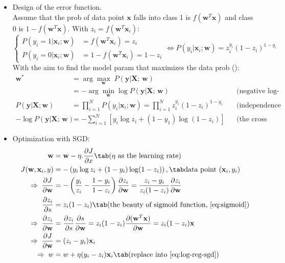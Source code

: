 \begin{itemize}
	\item Design of the error function.\\
	Assume that the \ac{prob} of data point $\textbf{x}$ falls into class 1 is $f(\textbf{w}^T\textbf{x})$ and class 0 is $1-f(\textbf{w}^T\textbf{x})$. With $z_i = f(\textbf{w}^T\textbf{x}_i)$:
	\begin{equation}
		\begin{cases}
			P(y_i=1|\textbf{x}_i; \textbf{w}) &= f(\textbf{w}^T\textbf{x}_i) = z_i \\
			P(y_i=0|\textbf{x}_i; \textbf{w}) &= 1 - f(\textbf{w}^T\textbf{x}_i) =1 - z_i
		\end{cases} \Leftrightarrow P(y_i | \textbf{x}_i; \textbf{w}) = z_i^{y_i}(1-z_i)^{1-y_i}
	\end{equation}
	With the aim to find the model \ac{param} that maximizes the data \ac{prob} ():
	\begin{align*}
		\textbf{w}^* &= \arg \underset{\textbf{w}}{\max}\;P(\textbf{y}|\textbf{X; w}) && \\
		&= - \arg \underset{\textbf{w}}{\min} \log P(\textbf{y}|\textbf{X; w}) && \text{(negative log-likelihood)} \\
		P(\mathbf{y}|\mathbf{X}; \mathbf{w}) &= \prod_{i=1}^N P(y_i| \mathbf{x}_i; \mathbf{w}) = \prod_{i=1}^N z_i^{y_i}(1 - z_i)^{1- y_i} && \text{(independence assumption)} \\
		- \log P(\textbf{y}|\textbf{X; w}) &= - \sum_{i=1}^{N} [ y_i\log z_i + (1-y_1)\log (1-z_i) ] && \text{(the cross entropy error)}
	\end{align*}
	
	\item Optimization with \ac{SGD}:
	\begin{align}
			\textbf{w} &= \textbf{w} - \eta.\frac{\partial J}{\partial x} \tab \text{($\eta$ as the learning rate)}
			\label{eq:log-reg-sgd}\\			
			J(\textbf{w}, \textbf{x}_i, y) &= -\left( y_i\log z_i + (1-y_i)\log(1-z_i) \right), \tab \text{data point $(\textbf{x}_i, y_i)$} \\
			\Rightarrow \; \frac{\partial J}{\partial \textbf{w}} &= - \left( \frac{y_i}{z_i} - \frac{1-y_i}{1-z_i} \right) \frac{\partial z_i}{\partial\textbf{w}} = \frac{z_i - y_i}{z_i(1-z_i)} \frac{\partial z_i}{\partial\textbf{w}} \\
			\frac{\partial z_i}{\partial s} &= z_i(1-z_i) \tab \text{(the beauty of sigmoid function, \eqref{eq:sigmoid})} \\
			\Rightarrow \; \frac{\partial z_i}{\partial\textbf{w}} &= \frac{\partial z_i}{\partial s} \frac{\partial s}{\partial \textbf{w}} = z_i(1-z_i) \frac{\partial(\textbf{w}^T\textbf{x})}{\partial \textbf{w}} = z_i(1-z_i) \textbf{x} \\
			\Rightarrow \; \frac{\partial J}{\partial \textbf{w}} &= (z_i - y_i) \textbf{x}_i\\
			\Rightarrow \; w &= w + \eta (y_i - z_i) \textbf{x}_i \tab \text{(replace into \eqref{eq:log-reg-sgd})}
	\end{align}
\end{itemize}

